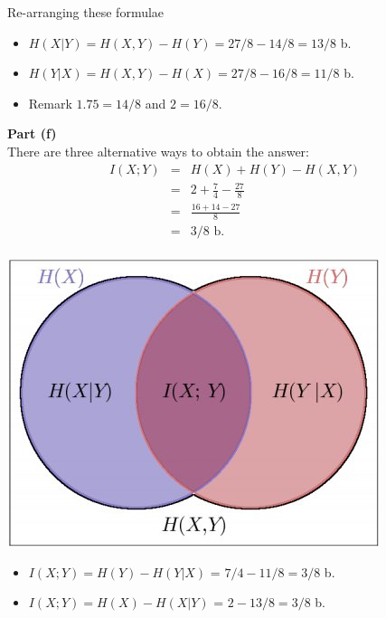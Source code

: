 \documentclass[a4paper,12pt]{article}
\begin{document}



\noindent Re-arranging these formulae
\begin{itemize}
\item $H(X|Y) = H(X,Y)-H(Y) = 27/8 - 14/8 = 13/8$ b. \bigskip
\item $H(Y|X) = H(X,Y)-H(X) = 27/8 - 16/8 = 11/8$ b.
\end{itemize}
\bigskip
\begin{itemize}
\item Remark $1.75 =14/8$ and $2 = 16/8$.\\\bigskip
\end{itemize}


\newpage 
\noindent \textbf{Part (f)}\\
There are three alternative ways to obtain the answer:
\begin{eqnarray*}
I(X; Y ) &=& H(X) + H(Y ) - H(X,Y )\\ 
&=& 2 + \frac{7}{4} - \frac{27}{8} \\
&=& \frac{16+14-27}{8} \\
&=& 3/8 \mbox{ b}.\\
\end{eqnarray*}

\begin{center}
\includegraphics[scale=0.8]{images/11BMutualInfo.jpg}
\end{center}

\begin{itemize}
\item $I(X; Y ) = H(Y ) - H(Y |X)$ = $7/4 - 11/8 = 3/8$ b.
\item $I(X; Y ) = H(X) - H(X|Y)$ = $2 - 13/8 = 3/8$ b.

\end{itemize}
\end{document}
